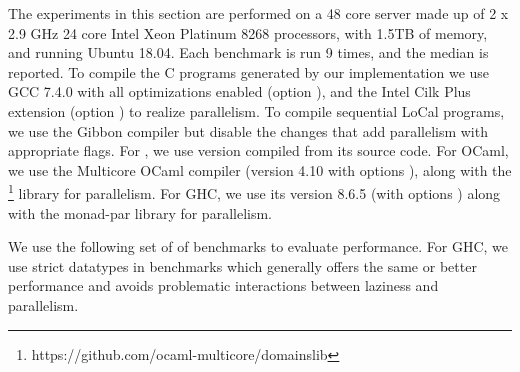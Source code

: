 
The experiments in this section are performed on a 48 core server made up of
2 x 2.9 GHz 24 core Intel Xeon Platinum 8268 processors, with 1.5TB of memory,
and running Ubuntu 18.04.
%
%
Each benchmark is run 9 times, and the median is reported.
%
To compile the C programs generated by our implementation we use
GCC 7.4.0 with all optimizations enabled (option ), and
the Intel Cilk Plus extension (option ) to realize parallelism.
%
To compile sequential LoCal programs, we use the Gibbon compiler but disable the
changes that add parallelism with appropriate flags.
%
For \MPL{}, we use version  compiled from its source code.
%
For OCaml, we use the Multicore OCaml compiler \cite{multicore-ocaml}
(version 4.10 with options ),
along with the  \footnote{https://github.com/ocaml-multicore/domainslib}
library for parallelism.
%
For GHC, we use its version 8.6.5 (with options ) along with
the monad-par\cite{monad-par} library for parallelism.

\newcommand{\numbenchmarks}{ }

We use the following set of of \numbenchmarks {} benchmarks to evaluate performance.
%
For GHC, we use strict datatypes in benchmarks which generally offers the
same or better performance and avoids problematic interactions between
laziness and parallelism.

